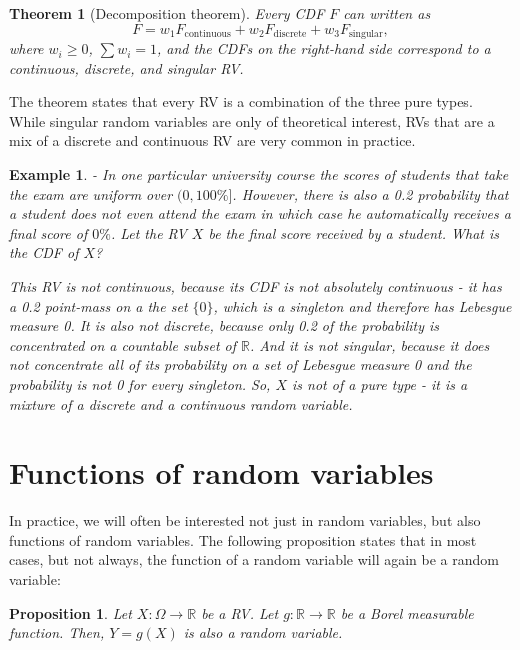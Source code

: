 \documentclass{book}
\theoremstyle{plain}%
\newtheorem{prototheorem}{Example}[section]
\newenvironment{cexample}
   {\colorlet{shadecolor}{gray!10}\begin{shaded}\begin{prototheorem}}
   {\end{prototheorem}\end{shaded}}
\newtheorem{theorem}{Theorem}[section]
\newtheorem{proposition}{Proposition}[section]
\theoremstyle{definition}
\newlength{\arrow}
\begin{document}
\begin{theorem}[Decomposition theorem]
Every CDF $F$ can written as $$F = w_1 F_\text{continuous} + w_2 F_\text{discrete} + w_3 F_\text{singular},$$ where $w_i \geq 0$, $\sum w_i = 1$, and the CDFs on the right-hand side correspond to a continuous, discrete, and singular RV.
\end{theorem}

The theorem states that every RV is a combination of the three pure types. While singular random variables are only of theoretical interest, RVs that are a mix of a discrete and continuous RV are very common in practice.

\begin{cexample}{}{-} In one particular university course the scores of students that take the exam are uniform over $(0,100\%]$. However, there is also a 0.2 probability that a student does not even attend the exam in which case he automatically receives a final score of $0\%$. Let the RV $X$ be the final score received by a student. What is the CDF of $X$?

This RV is not continuous, because its CDF is not absolutely continuous - it has a 0.2 point-mass on a the set $\{0\}$, which is a singleton and therefore has Lebesgue measure 0. It is also not discrete, because only 0.2 of the probability is concentrated on a countable subset of $\mathbb{R}$. And it is not singular, because it does not concentrate all of its probability on a set of Lebesgue measure 0 and the probability is not 0 for every singleton. So, $X$ is not of a pure type - it is a mixture of a discrete and a continuous random variable.
\end{cexample}


\section{Functions of random variables}

In practice, we will often be interested not just in random variables, but also functions of random variables. The following proposition states that in most cases, but not always, the function of a random variable will again be a random variable:

\begin{proposition}
Let $X: \Omega \rightarrow \mathbb{R}$ be a RV. Let $g: \mathbb{R} \rightarrow \mathbb{R}$ be a Borel measurable function. Then, $Y = g(X)$ is also a random variable.
\end{proposition}
\end{document}
